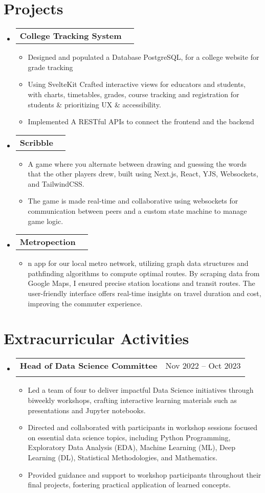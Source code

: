 \documentclass[letterpaper,11pt]{article}
\makeatletter
\newcommand{\redact}[1]{%
    \ifthenelse{\boolean{isRedacted}}{\sout{REDACTED}}{#1}%
}
\newcommand{\resumeItem}[1]{
  \item\small{
    {#1 \vspace{-2pt}}
  }
}
\newcommand{\resumeSubheading}[4]{
  \vspace{-2pt}\item
    \begin{tabular*}{0.97\textwidth}[t]{l@{\extracolsep{\fill}}r}
      \textbf{#1} & #2 \\
      \textit{\small#3} & \textit{\small #4} \\
    \end{tabular*}\vspace{-7pt}
}
\newcommand{\resumeProjectHeading}[2]{
    \item
    \begin{tabular*}{0.97\textwidth}{l@{\extracolsep{\fill}}r}
      \small#1 & #2 \\
    \end{tabular*}\vspace{-7pt}
}
\newcommand{\resumeSubHeadingListStart}{\begin{itemize}[leftmargin=0.15in, label={}]}
\newcommand{\resumeSubHeadingListEnd}{\end{itemize}}
\newcommand{\resumeItemListStart}{\begin{itemize}}
\newcommand{\resumeItemListEnd}{\end{itemize}\vspace{-5pt}}
\makeatother
\begin{document}
\section{Projects}
    \resumeSubHeadingListStart
      \resumeProjectHeading
          {\textbf{College Tracking System}}{}
          \resumeItemListStart
            \resumeItem{Designed and populated a Database PostgreSQL, for a college website for grade tracking}
            \resumeItem{Using SvelteKit Crafted interactive views for educators and students, with charts, timetables, grades, course tracking and registration for students \& prioritizing UX \& accessibility.}
            \resumeItem{Implemented A RESTful APIs to connect the frontend and the backend}
          \resumeItemListEnd
      \resumeProjectHeading
          {\textbf{Scribble}}{}
          \resumeItemListStart
            \resumeItem{A game where you alternate between drawing and guessing the words that the other players drew, built using Next.js, React, YJS, Websockets, and TailwindCSS.}
            \resumeItem{The game is made real-time and collaborative using websockets for communication between peers and a custom state machine to manage game logic.}
          \resumeItemListEnd
     \resumeProjectHeading
          {\textbf{Metropection}}{}
          \resumeItemListStart
            \resumeItem{n app for our local metro network, utilizing graph data structures and pathfinding algorithms to compute optimal routes. By scraping data from Google Maps, I ensured precise station locations and transit routes. The user-friendly interface offers real-time insights on travel duration and cost, improving the commuter experience.}
          \resumeItemListEnd

    \resumeSubHeadingListEnd


\section{Extracurricular Activities}
  \resumeSubHeadingListStart

    \resumeSubheading
      {Head of Data Science Committee }{Nov 2022 -- Oct 2023}
      {\redact{@Energia Powered}}{}
      \resumeItemListStart
        \resumeItem{Led a team of four to deliver impactful Data Science initiatives through biweekly workshops, crafting interactive learning materials such as presentations and Jupyter notebooks.}
        \resumeItem{Directed and collaborated with participants in workshop sessions focused on essential data science topics, including Python Programming, Exploratory Data Analysis (EDA), Machine Learning (ML), Deep Learning (DL), Statistical Methodologies, and Mathematics.}
        \resumeItem{Provided guidance and support to workshop participants throughout their final projects, fostering practical application of learned concepts.}
      \resumeItemListEnd
  \resumeSubHeadingListEnd


\end{document}
